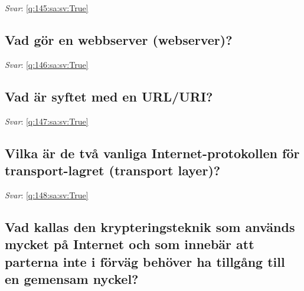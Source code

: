 \documentclass[a4paper,11pt,oneside]{article}
\begin{document}
\begin{sloppypar}
\vspace{1cm}

\textit{Svar}: \autoref{q:145:sa:sv:True}



\subsection{Vad g\"or en webbserver (webserver)?}

\label{q:146:sa:sv:False}

\vspace{2cm}

\noindent\makebox[\textwidth]{\hrulefill}

\vspace{1cm}

\textit{Svar}: \autoref{q:146:sa:sv:True}



\subsection{Vad \"ar syftet med en URL/URI?}

\label{q:147:sa:sv:False}

\vspace{2cm}

\noindent\makebox[\textwidth]{\hrulefill}

\vspace{1cm}

\textit{Svar}: \autoref{q:147:sa:sv:True}



\subsection{Vilka \"ar de tv\r{a} vanliga Internet-protokollen f\"or transport-lagret (transport layer)?}

\label{q:148:sa:sv:False}

\vspace{2cm}

\noindent\makebox[\textwidth]{\hrulefill}

\vspace{1cm}

\textit{Svar}: \autoref{q:148:sa:sv:True}



\subsection{Vad kallas den krypteringsteknik som anv\"ands mycket p\r{a} Internet och som inneb\"ar att parterna inte i f\"orv\"ag beh\"over ha tillg\r{a}ng till en gemensam nyckel?}


\end{sloppypar}
\end{document}
